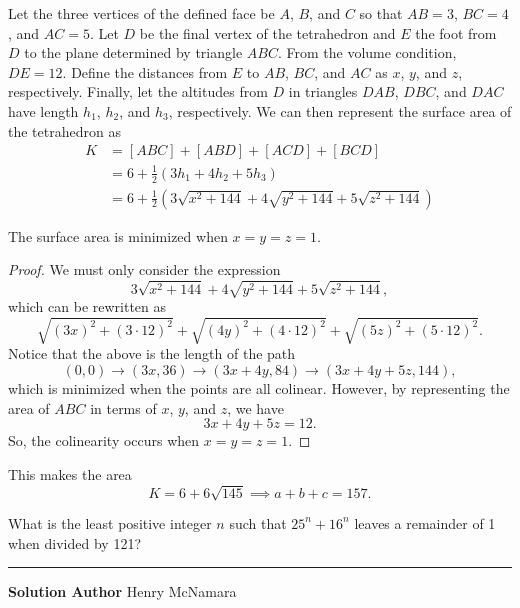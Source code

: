 \documentclass[11pt]{scrartcl}
\newcommand*{\problemfont}{\sffamily\bfseries}
\begin{document}
Let the three vertices of the defined face be $A$, $B$, and $C$ so that $AB = 3$, $BC = 4$, and $AC = 5$. Let $D$ be the final vertex of the tetrahedron and $E$ the foot from $D$ to the plane determined by triangle $ABC$. From the volume condition, $DE = 12$. Define the distances from $E$ to $AB$, $BC$, and $AC$ as $x$, $y$, and $z$, respectively. Finally, let the altitudes from $D$ in triangles $DAB$, $DBC$, and $DAC$ have length $h_{1}$, $h_{2}$, and $h_{3}$, respectively. We can then represent the surface area of the tetrahedron as
\begin{align*}
    K &= [ABC] + [ABD] + [ACD] + [BCD] \\
    &= 6 + \frac{1}{2}\left(3h_{1} + 4h_{2} + 5h_{3}\right) \\
    &= 6 + \frac{1}{2}\left(3\sqrt{x^{2} + 144} + 4\sqrt{y^{2} + 144} + 5\sqrt{z^{2} + 144}\right)
\end{align*}

\begin{claim*}
    The surface area is minimized when $x = y = z = 1$.
\end{claim*}
\begin{proof}
    We must only consider the expression
    \[3\sqrt{x^{2} + 144} + 4\sqrt{y^{2} + 144} + 5\sqrt{z^{2} + 144},\]
    which can be rewritten as
    \[\sqrt{(3x)^{2} + (3 \cdot 12)^{2}} + \sqrt{(4y)^{2} + (4 \cdot 12)^{2}} + \sqrt{(5z)^{2} + (5 \cdot 12)^{2}}.\]
    Notice that the above is the length of the path
    \[(0, 0) \rightarrow (3x, 36) \rightarrow (3x + 4y, 84) \rightarrow (3x + 4y + 5z, 144),\]
    which is minimized when the points are all colinear. However, by representing the area of $ABC$ in terms of $x$, $y$, and $z$, we have
    \[3x + 4y + 5z = 12.\]
    So, the colinearity occurs when $x = y = z = 1$.
\end{proof}
This makes the area
\[K = 6 + 6\sqrt{145} \implies a + b + c = \boxed{157}.\]

\pagebreak

\begin{problem}
    What is the least positive integer $n$ such that $25^{n} + 16^{n}$ leaves a remainder of 1 when divided by 121?
\end{problem}

\vspace{-\baselineskip}\rule{\textwidth}{0.4pt}

{\problemfont Solution Author} Henry McNamara
\end{document}
